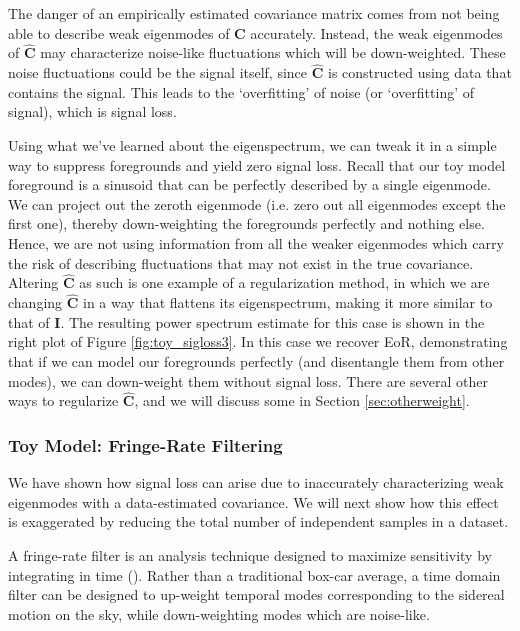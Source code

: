 \documentclass[preprint2,numberedappendix,tighten]{aastex6}  %
\begin{document}
The danger of an empirically estimated covariance matrix comes from not being able to describe weak eigenmodes of $\textbf{C}$ accurately. Instead, the weak eigenmodes of $\hat{\textbf{C}}$ may characterize noise-like fluctuations which will be down-weighted. These noise fluctuations could be the signal itself, since $\hat{\textbf{C}}$ is constructed using data that contains the signal. This leads to the `overfitting' of noise (or `overfitting' of signal), which is signal loss. 

Using what we've learned about the eigenspectrum, we can tweak it in a simple way to suppress foregrounds and yield zero signal loss. Recall that our toy model foreground is a sinusoid that can be perfectly described by a single eigenmode. We can project out the zeroth eigenmode (i.e. zero out all eigenmodes except the first one), thereby down-weighting the foregrounds perfectly and nothing else. Hence, we are not using information from all the weaker eigenmodes which carry the risk of describing fluctuations that may not exist in the true covariance. Altering $\hat{\textbf{C}}$ as such is one example of a regularization method, in which we are changing $\hat{\textbf{C}}$ in a way that flattens its eigenspectrum, making it more similar to that of $\textbf{I}$. The resulting power spectrum estimate for this case is shown in the right plot of Figure \ref{fig:toy_sigloss3}. In this case we recover EoR, demonstrating that if we can model our foregrounds perfectly (and disentangle them from other modes), we can down-weight them without signal loss. There are several other ways to regularize $\hat{\textbf{C}}$, and we will discuss some in Section \ref{sec:otherweight}.

\subsubsection{Toy Model: Fringe-Rate Filtering}

We have shown how signal loss can arise due to inaccurately characterizing weak eigenmodes with a data-estimated covariance. We will next show how this effect is exaggerated by reducing the total number of independent samples in a dataset. 

A fringe-rate filter is an analysis technique designed to maximize sensitivity by integrating in time (\citealt{parsons_et_al2016}). Rather than a traditional box-car average, a time domain filter can be designed to up-weight temporal modes corresponding to the sidereal motion on the sky, while down-weighting modes which are noise-like. 
\end{document}
